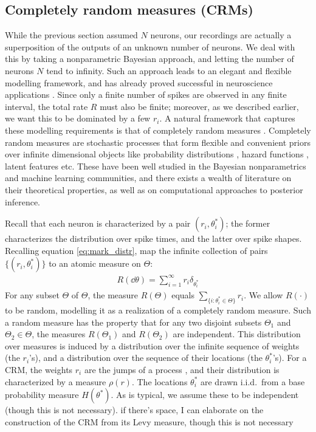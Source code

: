 \subsection{Completely random measures (CRMs)}
While the previous section assumed $N$ neurons, our recordings are actually a superposition of the outputs of an unknown
number of neurons. We deal with this by taking a nonparametric Bayesian approach, and letting the number of neurons $N$ tend to infinity. 
Such an approach leads to an elegant and flexible modelling framework, and has  already proved successful in neuroscience applications
\citep{WooGolBla2006}.
Since only a finite number of spikes are observed in any finite interval, the total rate $R$ must 
also be finite; moreover, as we described earlier, we want this to be dominated by a few $r_i$. 
A natural framework that captures these  modelling requirements is that of completely random measures \citep{Kingman:PJM67}.
Completely random measures are stochastic processes that form flexible and convenient priors over
infinite dimensional objects like probability distributions \citep{JamesLP09}, hazard functions \citep{Hjo1990}, latent features \citep{ThiJor2007} etc. 
These have been well studied in the Bayesian nonparametrics and machine learning communities, and there exists a wealth of literature on
their theoretical properties, as well as on computational approaches to posterior inference.

Recall that each neuron is characterized by a pair $(r_i, \theta^*_i)$; the former characterizes the distribution over spike times, and the latter over spike
shapes. Recalling equation \eqref{eq:mark_distr}, map the infinite collection of pairs $\{(r_i, \theta^*_i)\}$ to an atomic measure on $\Theta$:
\begin{align}
  R(\dd \theta) = \sum_{i=1}^{\infty} r_i \delta_{\theta^*_i}
\end{align}
For any subset $\varTheta$ of $\Theta$, the measure $R(\varTheta)$ equals \( \sum_{\{ i: \theta^*_i \in \varTheta \} } r_i\). We allow $R(\cdot)$ to be random,
modelling it as a realization of a completely random measure. Such a random measure has the property that for any two disjoint subsets $\varTheta_1$ 
and $\varTheta_2 \in \Theta$, the measures $R(\varTheta_1)$ and $R(\varTheta_2)$ are independent. 
This distribution over measures is induced by a distribution
over the infinite sequence of weights (the $r_i$'s), and a distribution over the sequence of their locations (the $\theta^*_i$'s). 
For a CRM, the weights $r_i$ are the jumps of a \Levy process \citep{Sato90}, and their distribution is characterized by a 
\Levy measure $\rho(r)$. The locations $\theta^*_i$ are drawn i.i.d.\  from a base probability measure $H(\theta^*)$.
As is typical, we assume these to be independent (though this is not necessary). {\color{red} if there's space, I
can elaborate on the construction of the CRM from its Levy measure, though this is not necessary}

